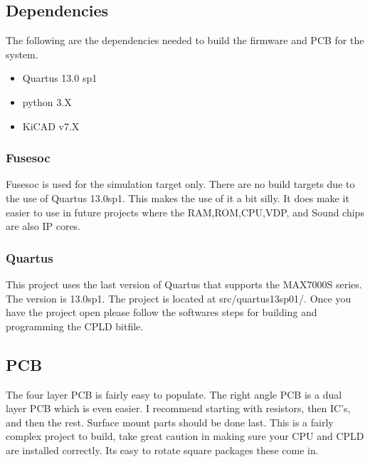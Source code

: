 \subsection{Dependencies}

\par
The following are the dependencies needed to build the firmware and PCB for the system.

\begin{itemize}
  \item Quartus 13.0 sp1
  \item python 3.X
  \item KiCAD v7.X
\end{itemize}

% 

\subsubsection{Fusesoc}
\par
Fusesoc is used for the simulation target only. There are no build targets due to the use of Quartus 13.0sp1.
This makes the use of it a bit silly. It does make it easier to use in future projects where the RAM,ROM,CPU,VDP,
and Sound chips are also IP cores.

% 

\subsubsection{Quartus}
\par
This project uses the last version of Quartus that supports the MAX7000S series. The version is 13.0sp1.
The project is located at src/quartus13sp01/. Once you have the project open please follow the softwares steps
for building and programming the CPLD bitfile.

\subsection{PCB}

\par
The four layer PCB is fairly easy to populate. The right angle PCB is a dual layer PCB which is even easier.
I recommend starting with resistors, then IC's, and then the rest. Surface mount parts should be done last.
This is a fairly complex project to build, take great caution in making sure your CPU and CPLD are installed
correctly. Its easy to rotate square packages these come in.

